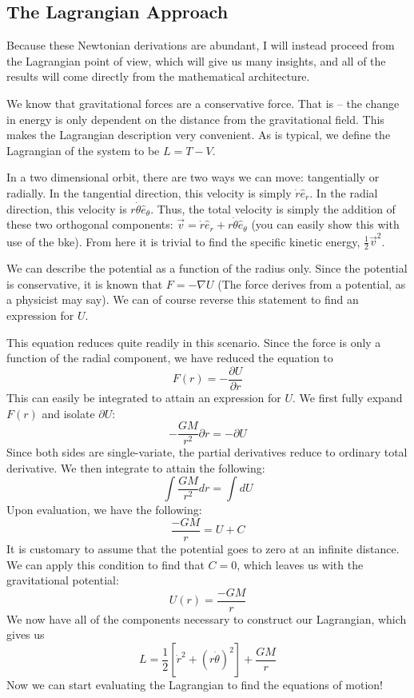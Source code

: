 \subsection{The Lagrangian Approach}

Because these Newtonian derivations are abundant, I will instead proceed from the \gls{Lagrangian} point of view, which will give us many insights, and all of the results will come directly from the mathematical architecture.

We know that gravitational forces are a conservative force. That is -- the change in energy is only dependent on the distance from the gravitational field. This makes the \gls{Lagrangian} description very convenient. As is typical, we define the \gls{Lagrangian} of the system to be $L=T-V$.

In a two dimensional orbit, there are two ways we can move: tangentially or radially. In the tangential direction, this velocity is simply $\dot{r}\hat{e}_r$. In the radial direction, this velocity is $r\dot{\theta
}\hat{e}_{\theta}$. Thus, the total velocity is simply the addition of these two orthogonal components:
$\vec{v}=\dot{r}\hat{e}_r+r\dot{\theta}\hat{e}_\theta$ (you can easily show this with use of the \gls{bke}). From here it is trivial to find the specific kinetic energy, $\frac{1}{2}\vec{v}^2$.

We can describe the potential as a function of the radius only. Since the potential is conservative, it is known that $F=-\nabla U$ (The force derives from a potential, as a physicist may say). We can of course reverse this statement to find an expression for $U$.

This equation reduces quite readily in this scenario. Since the force is only a function of the radial component, we have reduced the equation to $$F(r)=-\frac{\partial U}{\partial r}$$
This can easily be integrated to attain an expression for $U$. We first fully expand $F(r)$ and isolate $\partial U$:
$$-\frac{GM}{r^2}\partial r=-\partial U$$
Since both sides are single-variate, the partial derivatives reduce to ordinary total derivative. We then integrate to attain the following:
$$\int\frac{GM}{r^2} dr=\int dU$$
Upon evaluation, we have the following:
$$\frac{-GM}{r}=U+C$$
It is customary to assume that the potential goes to zero at an infinite distance. We can apply this condition to find that $C=0$, which leaves us with the gravitational potential:
$$U(r)=\frac{-GM}{r}$$
We now have all of the components necessary to construct our \gls{Lagrangian}, which gives us
$$L=\frac{1}{2}\left[\dot{r}^2+\left(r\dot{\theta}\right)^2\right]+\frac{GM}{r}$$
Now we can start evaluating the \gls{Lagrangian} to find the equations of motion!

